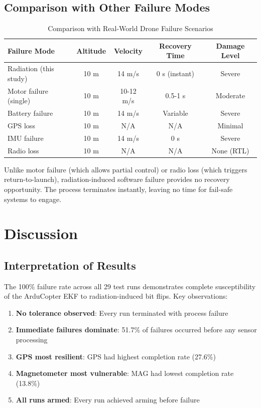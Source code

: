 \documentclass[11pt,a4paper]{article}
\begin{document}
\subsection{Comparison with Other Failure Modes}

\begin{table}[H]
\centering
\caption{Comparison with Real-World Drone Failure Scenarios}
\label{tab:comparison}
\begin{tabular}{@{}lcccc@{}}
\toprule
\textbf{Failure Mode} & \textbf{Altitude} & \textbf{Velocity} & \textbf{Recovery Time} & \textbf{Damage Level} \\
\midrule
Radiation (this study) & 10 m & 14 m/s & 0 s (instant) & Severe \\
Motor failure (single) & 10 m & 10-12 m/s & 0.5-1 s & Moderate \\
Battery failure & 10 m & 14 m/s & Variable & Severe \\
GPS loss & 10 m & N/A & N/A & Minimal \\
IMU failure & 10 m & 14 m/s & 0 s & Severe \\
Radio loss & 10 m & N/A & N/A & None (RTL) \\
\bottomrule
\end{tabular}
\end{table}

Unlike motor failure (which allows partial control) or radio loss (which triggers return-to-launch), radiation-induced software failure provides no recovery opportunity. The process terminates instantly, leaving no time for fail-safe systems to engage.

\section{Discussion}

\subsection{Interpretation of Results}

The 100\% failure rate across all 29 test runs demonstrates complete susceptibility of the ArduCopter EKF to radiation-induced bit flips. Key observations:

\begin{enumerate}
  \item \textbf{No tolerance observed}: Every run terminated with process failure
  \item \textbf{Immediate failures dominate}: 51.7\% of failures occurred before any sensor processing
  \item \textbf{GPS most resilient}: GPS had highest completion rate (27.6\%)
  \item \textbf{Magnetometer most vulnerable}: MAG had lowest completion rate (13.8\%)
  \item \textbf{All runs armed}: Every run achieved arming before failure
\end{enumerate}
\end{document}
